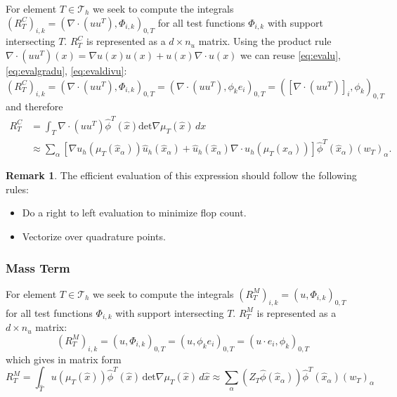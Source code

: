 \documentclass[a4paper,
		     12pt,
		     DIV10,
		     DIVcalc,
		     headings=normal,
		     oneside,
		     bibliography=totoc,
		     headsepline=false,
		     headinclude]{scrartcl}
\theoremstyle{definition}
\newtheorem{Rem}[Def]{Remark}
\begin{document}
For element $T\in\mathcal{T}_h$ we seek to compute the integrals 
$(R^C_T)_{i,k} = (\nabla\cdot(uu^T),\Phi_{i,k})_{0,T}$ for all test functions $\Phi_{i,k}$
with support intersecting $T$. $R^C_T$ is represented as a $d\times n_u$ matrix.
Using the product rule $\nabla\cdot(uu^T)(x) = \nabla u(x) u(x) + u(x) \nabla\cdot u(x)$ we can reuse \eqref{eq:evalu},  \eqref{eq:evalgradu},
\eqref{eq:evaldivu}:
\begin{equation*}
(R^C_T)_{i,k} = \left(\nabla\cdot(uu^T),\Phi_{i,k}\right)_{0,T} = \left(\nabla\cdot(uu^T),\phi_{k}e_i \right )_{0,T} = 
\left(\left[\nabla\cdot(uu^T)\right]_i,\phi_{k}\right)_{0,T}
\end{equation*}
and therefore
\begin{equation}
\begin{split}
R^C_T &= \int_T \nabla\cdot(uu^T) \hat\phi^T(\hat x) \text{det} \nabla\mu_T(\hat x) \,dx\\
&\approx \sum_\alpha \left[  \nabla u_h(\mu_T(\hat x_\alpha)) \hat u_h(\hat x_\alpha) 
+ \hat u_h(\hat x_\alpha) \nabla\cdot u_h(\mu_T(\hat x_\alpha)) \right] \hat\phi^T(\hat x_\alpha) (w_T)_\alpha.
\end{split}
\end{equation}

\begin{Rem}
The efficient evaluation of this expression should follow the following rules:
\begin{itemize}
\item Do a right to left evaluation to minimize flop count.
\item Vectorize over quadrature points.
\end{itemize}
\end{Rem}

\subsubsection*{Mass Term}

For element $T\in\mathcal{T}_h$ we seek to compute the integrals 
$(R^{M}_T)_{i,k} = ( u, \Phi_{i,k})_{0,T}$ for all test functions $\Phi_{i,k}$
with support intersecting $T$. $R^M_T$ is represented as a $d\times n_u$ matrix:
\begin{equation*}
(R^{M}_T)_{i,k} = \left( u,\Phi_{i,k}\right)_{0,T} =  \left( u,\phi_{k} e_i\right)_{0,T} =  \left( u\cdot e_i,\phi_{k}\right)_{0,T}
\end{equation*}
which gives in matrix form
\begin{equation}
R^{M}_T = \int_{\hat T} u(\mu_T(\hat x)) \hat\phi^T(\hat x)  \, \text{det} \nabla\mu_T(\hat x) \,d\hat x
\approx \sum_\alpha (Z_T \hat\phi(\hat x_\alpha)) \hat\phi^T(\hat x_\alpha) (w_T)_\alpha
\end{equation}
\end{document}
